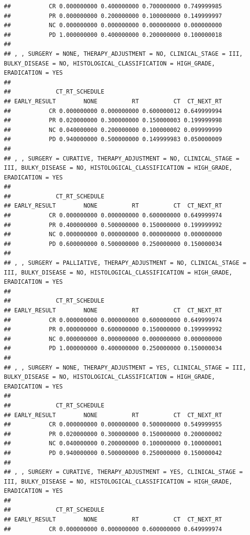\documentclass[]{article}
\begin{document}
\begin{verbatim}
##           CR 0.000000000 0.400000000 0.700000000 0.749999985
##           PR 0.000000000 0.200000000 0.100000000 0.149999997
##           NC 0.000000000 0.000000000 0.000000000 0.000000000
##           PD 1.000000000 0.400000000 0.200000000 0.100000018
## 
## , , SURGERY = NONE, THERAPY_ADJUSTMENT = NO, CLINICAL_STAGE = III, BULKY_DISEASE = NO, HISTOLOGICAL_CLASSIFICATION = HIGH_GRADE, ERADICATION = YES
## 
##             CT_RT_SCHEDULE
## EARLY_RESULT        NONE          RT          CT  CT_NEXT_RT
##           CR 0.000000000 0.000000000 0.600000012 0.649999994
##           PR 0.020000000 0.300000000 0.150000003 0.199999998
##           NC 0.040000000 0.200000000 0.100000002 0.099999999
##           PD 0.940000000 0.500000000 0.149999983 0.050000009
## 
## , , SURGERY = CURATIVE, THERAPY_ADJUSTMENT = NO, CLINICAL_STAGE = III, BULKY_DISEASE = NO, HISTOLOGICAL_CLASSIFICATION = HIGH_GRADE, ERADICATION = YES
## 
##             CT_RT_SCHEDULE
## EARLY_RESULT        NONE          RT          CT  CT_NEXT_RT
##           CR 0.000000000 0.000000000 0.600000000 0.649999974
##           PR 0.400000000 0.500000000 0.150000000 0.199999992
##           NC 0.000000000 0.000000000 0.000000000 0.000000000
##           PD 0.600000000 0.500000000 0.250000000 0.150000034
## 
## , , SURGERY = PALLIATIVE, THERAPY_ADJUSTMENT = NO, CLINICAL_STAGE = III, BULKY_DISEASE = NO, HISTOLOGICAL_CLASSIFICATION = HIGH_GRADE, ERADICATION = YES
## 
##             CT_RT_SCHEDULE
## EARLY_RESULT        NONE          RT          CT  CT_NEXT_RT
##           CR 0.000000000 0.000000000 0.600000000 0.649999974
##           PR 0.000000000 0.600000000 0.150000000 0.199999992
##           NC 0.000000000 0.000000000 0.000000000 0.000000000
##           PD 1.000000000 0.400000000 0.250000000 0.150000034
## 
## , , SURGERY = NONE, THERAPY_ADJUSTMENT = YES, CLINICAL_STAGE = III, BULKY_DISEASE = NO, HISTOLOGICAL_CLASSIFICATION = HIGH_GRADE, ERADICATION = YES
## 
##             CT_RT_SCHEDULE
## EARLY_RESULT        NONE          RT          CT  CT_NEXT_RT
##           CR 0.000000000 0.000000000 0.500000000 0.549999955
##           PR 0.020000000 0.300000000 0.150000000 0.200000002
##           NC 0.040000000 0.200000000 0.100000000 0.100000001
##           PD 0.940000000 0.500000000 0.250000000 0.150000042
## 
## , , SURGERY = CURATIVE, THERAPY_ADJUSTMENT = YES, CLINICAL_STAGE = III, BULKY_DISEASE = NO, HISTOLOGICAL_CLASSIFICATION = HIGH_GRADE, ERADICATION = YES
## 
##             CT_RT_SCHEDULE
## EARLY_RESULT        NONE          RT          CT  CT_NEXT_RT
##           CR 0.000000000 0.000000000 0.600000000 0.649999974

\end{verbatim}
\end{document}
